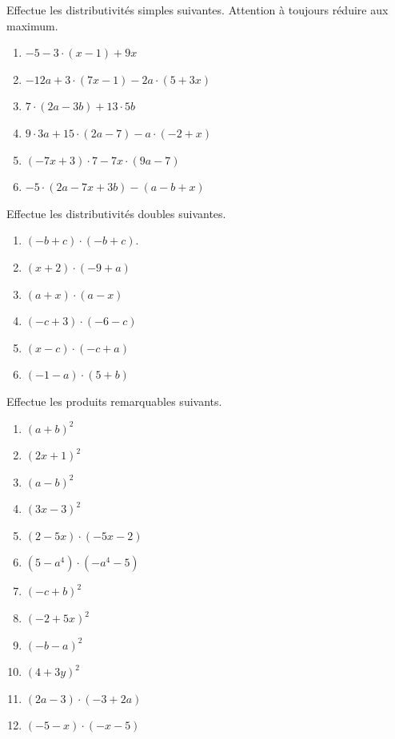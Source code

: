 \documentclass[12pt,parskip=half-, twoside=semi]{scrartcl}
\begin{document}
\begin{exercise}Effectue les distributivités simples suivantes. Attention à toujours réduire aux maximum.
  \begin{enumerate}[cols=2]
    \item $-5-3 \cdot(x-1)+9 x$
    \item $-12 a+3 \cdot(7 x-1)-2 a \cdot(5+3 x)$
    \item $7 \cdot(2 a-3 b)+13 \cdot 5 b$
    \item $9 \cdot 3 a+15 \cdot(2 a-7)-a \cdot(-2+x)$
    \item $(-7 x+3) \cdot 7-7 x \cdot(9 a-7)$
    \item $-5 \cdot(2 a-7 x+3 b)-(a-b+x)$
  \end{enumerate}
\end{exercise}


\begin{exercise}Effectue les distributivités doubles suivantes.
  \begin{enumerate}[cols=3]
    \item $(-b+c) \cdot(-b+c)$.
    \item $(x+2) \cdot(-9+a)$
    \item $(a+x) \cdot(a-x)$
    \item $(-c+3) \cdot(-6-c)$
    \item $(x-c) \cdot(-c+a)$
    \item $(-1-a) \cdot(5+b)$
  \end{enumerate}
\end{exercise}

\begin{exercise}Effectue les produits remarquables suivants.
  \begin{enumerate}[cols=3]
      \item $(a+b)^2$
      \item $(2 x+1)^2$
      \item $(a-b)^2$
      \item $(3 x-3)^2$
      \item $(2-5 x) \cdot(-5 x-2)$
      \item $\left(5-a^4\right) \cdot\left(-a^4-5\right)$
      \item $(-c+b)^2$
      \item $(-2+5 x)^2$
      \item $(-b-a)^2$
      \item $(4+3 y)^2$
      \item $(2 a-3) \cdot(-3+2 a)$
      \item $(-5-x) \cdot(-x-5)$
  \end{enumerate}
\end{exercise}
\end{document}

